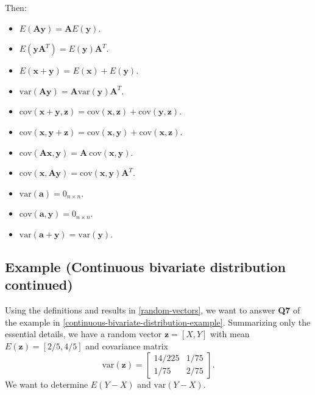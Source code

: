 \documentclass[
]{book}
\providecommand{\tightlist}{%
  \setlength{\itemsep}{0pt}\setlength{\parskip}{0pt}}
\theoremstyle{definition}
\theoremstyle{definition}
\theoremstyle{definition}
\theoremstyle{definition}
\theoremstyle{remark}
\begin{document}
Then:

\begin{itemize}
\tightlist
\item
  \(E(\mathbf{A}\mathbf{y})=\mathbf{A}E(\mathbf{y})\).
\item
  \(E(\mathbf{y}\mathbf{A}^T )=E(\mathbf{y}) \mathbf{A}^T\).
\item
  \(E(\mathbf{x}+\mathbf{y})=E(\mathbf{x})+E(\mathbf{y})\).
\item
  \(\mathrm{var}(\mathbf{A}\mathbf{y})=\mathbf{A}\mathrm{var}(\mathbf{y}) \mathbf{A}^T\).
\item
  \(\mathrm{cov}(\mathbf{x}+\mathbf{y},\mathbf{z})=\mathrm{cov}(\mathbf{x},\mathbf{z})+\mathrm{cov}(\mathbf{y},\mathbf{z})\).
\item
  \(\mathrm{cov}(\mathbf{x},\mathbf{y}+\mathbf{z})=\mathrm{cov}(\mathbf{x},\mathbf{y})+\mathrm{cov}(\mathbf{x},\mathbf{z})\).
\item
  \(\mathrm{cov}(\mathbf{A}\mathbf{x},\mathbf{y})=\mathbf{A}\ \mathrm{cov}(\mathbf{x},\mathbf{y})\).
\item
  \(\mathrm{cov}(\mathbf{x},\mathbf{A}\mathbf{y})=\mathrm{cov}(\mathbf{x},\mathbf{y}) \mathbf{A}^T\).
\item
  \(\mathrm{var}(\mathbf{a})= 0_{n\times n}\).
\item
  \(\mathrm{cov}(\mathbf{a},\mathbf{y})=0_{n\times n}\).
\item
  \(\mathrm{var}(\mathbf{a}+\mathbf{y})=\mathrm{var}(\mathbf{y})\).
\end{itemize}

\hypertarget{example-continuous-bivariate-distribution-continued}{%
\subsection{Example (Continuous bivariate distribution continued)}\label{example-continuous-bivariate-distribution-continued}}

Using the definitions and results in \ref{random-vectors}, we want to answer \textbf{Q7} of the example in \ref{continuous-bivariate-distribution-example}. Summarizing only the essential details, we have a random vector \(\mathbf{z}=[X, Y]\) with mean \(E(\mathbf{z})=[2/5, 4/5]\) and covariance matrix
\[
\mathrm{var}(\mathbf{z})=
\begin{bmatrix}
14/225 & 1/75 \\
1/75 & 2/75
\end{bmatrix}.
\] We want to determine \(E(Y-X)\) and \(\mathrm{var}(Y-X)\).
\end{document}
